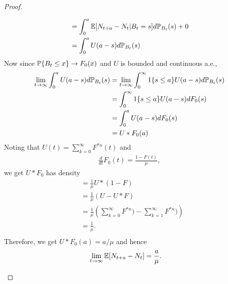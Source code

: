 \documentclass[all-lectures.tex]{subfiles}
\begin{document}
\begin{thm}
\begin{proof}
\begin{itemize}
\begin{align*}
&= \int_0^a \E[N_{t+a} - N_t|B_t = s]d \P_{B_t}(s) + 0 \\
&= \int_0^a U(a-s) d\P_{B_t}(s) \\
\end{align*}
Now since $\P\{B_t \leq x\} \to F_0(x)$  and $U$ is bounded and continuous a.e.,
\begin{align*}
\lim_{t\to \infty} \int_0^a U(a-s) d\P_{B_t}(s) &= \lim_{t\to \infty} \int_0^\infty 1\{s\leq a\}U(a-s) d\P_{B_t}(s) \\
&= \int_0^\infty 1\{s\leq a\}U(a-s) dF_0(s) \\
&= \int_0^a U(a-s) dF_0(s) \\
&= U * F_0 (a)
\end{align*}
Noting that $U(t) = \sum_{k=0}^\infty F^{*n}(t)$ and 
\begin{align*}
\frac{d}{dt}F_0(t) = \frac{1-F(t)}{\mu},
\end{align*}
 we get $U*F_0$ has density
\begin{align*}
 &= \frac{1}{\mu} U*(1-F) \\
&= \frac{1}{\mu} (U - U*F)\\
&= \frac{1}{\mu} \left(\sum_{k=0}^\infty F^{*n}) - \sum_{k=1}^\infty F^{*n}) \right) \\
&= \frac{1}{\mu}. \\
\end{align*}
Therefore, we get $U*F_0(a) = a/\mu$ and hence
\begin{align*}
\lim_{t \to \infty} \E[N_{t+a} - N_t] &=  \frac{a}{\mu}.
\end{align*}


\end{itemize}
\end{proof}
\end{thm}
\end{document}

